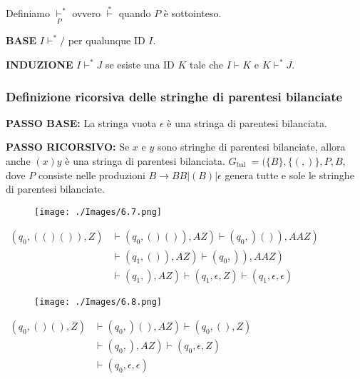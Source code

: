 Definiamo $\underset{P}{\vdash}^{*}$ ovvero $\stackrel{*}{\vdash}$ quando $P$ è sottointeso.

\textbf{BASE}  $I \vdash^{*} /$ per qualunque ID $I .$

\textbf{INDUZIONE} $I \vdash^{*} J$ se esiste una ID $K$ tale che $I \vdash K$ e $K \vdash^{*} J$.

\subsubsection{Definizione ricorsiva delle stringhe di parentesi bilanciate}
\textbf{PASSO BASE:} La stringa vuota $\epsilon$ è una stringa di parentesi bilanciata.

\textbf{PASSO RICORSIVO: }Se $x$ e $y$ sono stringhe di parentesi bilanciate, allora anche $(x) y$ è una stringa di parentesi bilanciata.
$G_{\text {bal }}=(\{B\},\{(,)\}, P, B$, dove $P$ consiste nelle produzioni $B \rightarrow B B|(B)| \epsilon$
genera tutte e sole le stringhe di parentesi bilanciate.


\begin{figure}[hbpt!]
    \centering
    \texttt{[image: ./Images/6.7.png]}
\end{figure}
\FloatBarrier

$\begin{aligned}\left(q_{0},(()()), Z\right) &\left.\left.\left.\vdash\left(q_{0},()()\right), A Z\right) \vdash\left(q_{0},\right)()\right), A A Z\right) \\ &\left.\left.\left.\vdash\left(q_{1},()\right), A Z\right) \vdash\left(q_{0},\right)\right), A A Z\right) \\ &\left.\vdash\left(q_{1},\right), A Z\right) \vdash\left(q_{1}, \epsilon, Z\right) \vdash\left(q_{1}, \epsilon, \epsilon\right) \end{aligned}$

\begin{figure}[hbpt!]
    \centering
    \texttt{[image: ./Images/6.8.png]}
\end{figure}
\FloatBarrier

$\begin{aligned}\left(q_{0},()(), Z\right) &\left.\vdash\left(q_{0},\right)(), A Z\right) \vdash\left(q_{0},(), Z\right) \\ &\left.\vdash\left(q_{0},\right), A Z\right) \vdash\left(q_{0}, \epsilon, Z\right) \\ & \vdash\left(q_{0}, \epsilon, \epsilon\right) \end{aligned}$

